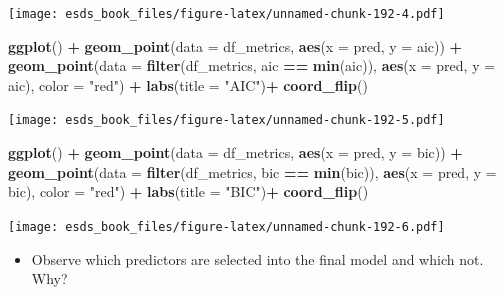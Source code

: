 \documentclass[
]{book}
\newenvironment{Shaded}{\begin{snugshade}}{\end{snugshade}}
\newcommand{\DataTypeTok}[1]{\textcolor[rgb]{0.13,0.29,0.53}{#1}}
\newcommand{\KeywordTok}[1]{\textcolor[rgb]{0.13,0.29,0.53}{\textbf{#1}}}
\newcommand{\NormalTok}[1]{#1}
\newcommand{\OperatorTok}[1]{\textcolor[rgb]{0.81,0.36,0.00}{\textbf{#1}}}
\newcommand{\StringTok}[1]{\textcolor[rgb]{0.31,0.60,0.02}{#1}}
\providecommand{\tightlist}{%
  \setlength{\itemsep}{0pt}\setlength{\parskip}{0pt}}
\begin{document}
\texttt{[image: esds\_book\_files/figure-latex/unnamed-chunk-192-4.pdf]}

\begin{Shaded}
\begin{Highlighting}[]
\KeywordTok{ggplot}\NormalTok{() }\OperatorTok{+}
\StringTok{  }\KeywordTok{geom_point}\NormalTok{(}\DataTypeTok{data =}\NormalTok{ df_metrics, }\KeywordTok{aes}\NormalTok{(}\DataTypeTok{x =}\NormalTok{ pred, }\DataTypeTok{y =}\NormalTok{ aic)) }\OperatorTok{+}
\StringTok{  }\KeywordTok{geom_point}\NormalTok{(}\DataTypeTok{data =} \KeywordTok{filter}\NormalTok{(df_metrics, aic }\OperatorTok{==}\StringTok{ }\KeywordTok{min}\NormalTok{(aic)), }\KeywordTok{aes}\NormalTok{(}\DataTypeTok{x =}\NormalTok{ pred, }\DataTypeTok{y =}\NormalTok{ aic), }\DataTypeTok{color =} \StringTok{"red"}\NormalTok{) }\OperatorTok{+}
\StringTok{  }\KeywordTok{labs}\NormalTok{(}\DataTypeTok{title =} \StringTok{"AIC"}\NormalTok{)}\OperatorTok{+}\StringTok{ }
\StringTok{  }\KeywordTok{coord_flip}\NormalTok{()}
\end{Highlighting}
\end{Shaded}

\texttt{[image: esds\_book\_files/figure-latex/unnamed-chunk-192-5.pdf]}

\begin{Shaded}
\begin{Highlighting}[]
\KeywordTok{ggplot}\NormalTok{() }\OperatorTok{+}
\StringTok{  }\KeywordTok{geom_point}\NormalTok{(}\DataTypeTok{data =}\NormalTok{ df_metrics, }\KeywordTok{aes}\NormalTok{(}\DataTypeTok{x =}\NormalTok{ pred, }\DataTypeTok{y =}\NormalTok{ bic)) }\OperatorTok{+}
\StringTok{  }\KeywordTok{geom_point}\NormalTok{(}\DataTypeTok{data =} \KeywordTok{filter}\NormalTok{(df_metrics, bic }\OperatorTok{==}\StringTok{ }\KeywordTok{min}\NormalTok{(bic)), }\KeywordTok{aes}\NormalTok{(}\DataTypeTok{x =}\NormalTok{ pred, }\DataTypeTok{y =}\NormalTok{ bic), }\DataTypeTok{color =} \StringTok{"red"}\NormalTok{) }\OperatorTok{+}
\StringTok{  }\KeywordTok{labs}\NormalTok{(}\DataTypeTok{title =} \StringTok{"BIC"}\NormalTok{)}\OperatorTok{+}\StringTok{ }
\StringTok{  }\KeywordTok{coord_flip}\NormalTok{()}
\end{Highlighting}
\end{Shaded}

\texttt{[image: esds\_book\_files/figure-latex/unnamed-chunk-192-6.pdf]}

\begin{itemize}
\tightlist
\item
  Observe which predictors are selected into the final model and which not. Why?
\end{itemize}
\end{document}
